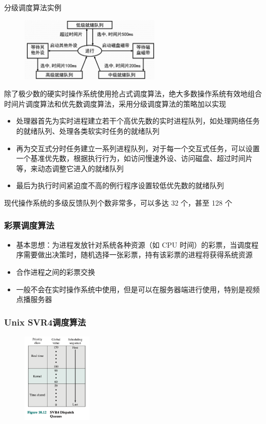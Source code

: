 \documentclass[cs4size,a4paper,10pt]{ctexart}
\begin{document}
	分级调度算法实例
	\begin{figure}[H]
		\centering
		\includegraphics[width=0.6\textwidth]{img/2.5.4}
	\end{figure}

	除了极少数的硬实时操作系统使用抢占式调度算法，绝大多数操作系统有效地组合时间片调度算法和优先数调度算法，采用分级调度算法的策略加以实现
	\begin{itemize}
		\item 处理器首先为实时进程建立若干个高优先数的实时进程队列，如处理网络任务的就绪队列、处理各类软实时任务的就绪队列
		\item 再为交互式分时任务建立一系列进程队列，对于每一个交互式任务，可以设置一个基准优先数，根据执行行为，如访问慢速外设、访问磁盘、超过时间片等，来动态调整它进入的就绪队列
		\item 最后为执行时间紧迫度不高的例行程序设置较低优先数的就绪队列
	\end{itemize}
	现代操作系统的多级反馈队列个数非常多，可以多达 32 个，甚至 128 个

	\subsubsection{彩票调度算法}
	\begin{itemize}
		\item 基本思想：为进程发放针对系统各种资源（如 CPU 时间）的彩票，当调度程序需要做出决策时，随机选择一张彩票，持有该彩票的进程将获得系统资源
		\item 合作进程之间的彩票交换
		\item 一般不会在实时操作系统中使用，但是可以在服务器端进行使用，特别是视频点播服务器
	\end{itemize}

	\subsubsection{Unix SVR4调度算法}
	\begin{figure}[H]
		\centering
		\includegraphics[width=0.3\textwidth]{img/2.5.6.1}
	\end{figure}
\end{document}
